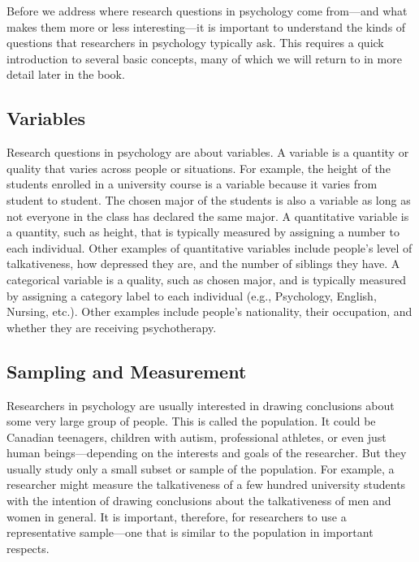  Before we address where research questions in psychology come from---and what makes them more or less interesting---it is important to understand the kinds of questions that researchers in psychology typically ask. This requires a quick introduction to several basic concepts, many of which we will return to in more detail later in the book.
 
 \subsection{Variables}
 Research questions in psychology are about variables. A variable is a quantity or quality that varies across people or situations. For example, the height of the students enrolled in a university course is a variable because it varies from student to student. The chosen major of the students is also a variable as long as not everyone in the class has declared the same major. A quantitative variable is a quantity, such as height, that is typically measured by assigning a number to each individual. Other examples of quantitative variables include people's level of talkativeness, how depressed they are, and the number of siblings they have. A categorical variable is a quality, such as chosen major, and is typically measured by assigning a category label to each individual (e.g., Psychology, English, Nursing, etc.). Other examples include people's nationality, their occupation, and whether they are receiving psychotherapy.
 
\subsection{Sampling and Measurement}
Researchers in psychology are usually interested in drawing conclusions about some very large group of people. This is called the population. It could be Canadian teenagers, children with autism, professional athletes, or even just human beings---depending on the interests and goals of the researcher. But they usually study only a small subset or sample of the population. For example, a researcher might measure the talkativeness of a few hundred university students with the intention of drawing conclusions about the talkativeness of men and women in general. It is important, therefore, for researchers to use a representative sample---one that is similar to the population in important respects.

